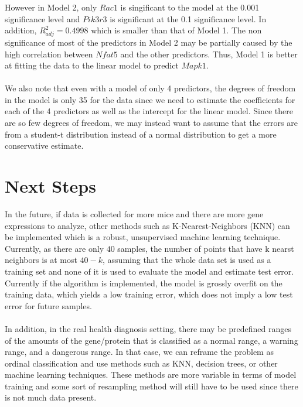 \documentclass{article}
\begin{document}
However in Model 2, only $Rac1$ is singificant to the model at the 0.001 significance level and $Pik3r3$ is significant at the 0.1 significance level.  In addition, $R^2_{adj} = 0.4998$ which is smaller than that of Model 1.  The non significance of most of the predictors in Model 2 may be partially caused by the high correlation between $Nfat5$ and the other predictors.  Thus, Model 1 is better at fitting the data to the linear model to predict $Mapk1$.\\
\null\\
We also note that even with a model of only 4 predictors, the degrees of freedom in the model is only 35 for the data since we need to estimate the coefficients for each of the 4 predictors as well as the intercept for the linear model.  Since there are so few degrees of freedom, we may instead want to assume that the errors are from a student-t distribution instead of a normal distribution to get a more conservative estimate.
%
\section{Next Steps}
In the future, if data is collected for more mice and there are more gene expressions to analyze, other methods such as K-Nearest-Neighbors (KNN) can be implemented which is a robust, unsupervised machine learning technique.  Currently, as there are only $40$ samples, the number of points that have k nearst neighbors is at most $40-k$, assuming that the whole data set is used as a training set and none of it is used to evaluate the model and estimate test error.  Currently if the algorithm is implemented, the model is grossly overfit on the training data, which yields a low training error, which does not imply a low test error for future samples.\\
\null\\
In addition, in the real health diagnosis setting, there may be predefined ranges of the amounts of the gene/protein that is classified as a normal range, a warning range, and a dangerous range.  In that case, we can reframe the problem as ordinal classification and use methods such as KNN, decision trees, or other machine learning techniques.  These methods are more variable in terms of model training and some sort of resampling method will still have to be used since there is not much data present. 
\end{document}
